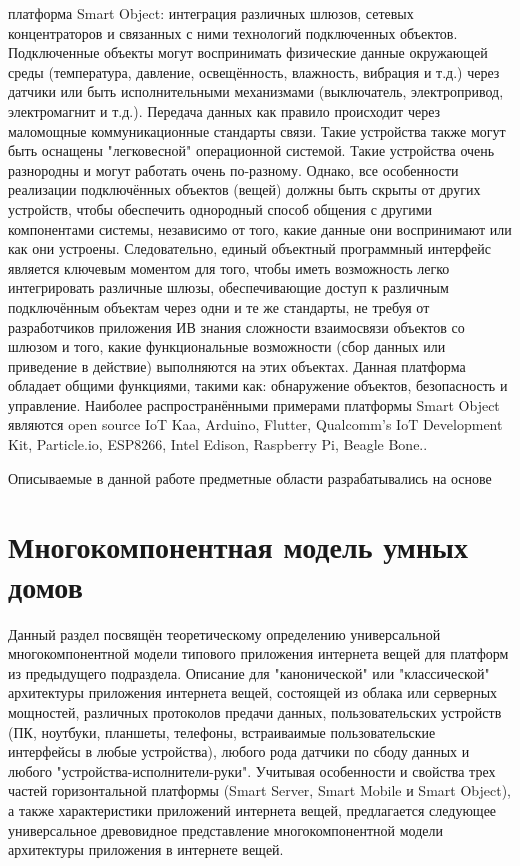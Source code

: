 \begin{textitemize}
    \item платформа Smart Object: интеграция различных шлюзов, сетевых концентраторов и связанных с ними технологий подключенных объектов. Подключенные объекты могут воспринимать физические данные окружающей среды (температура, давление, освещённость, влажность, вибрация и т.д.) через датчики или быть исполнительными механизмами (выключатель, электропривод, электромагнит и т.д.). Передача данных как правило происходит через маломощные коммуникационные стандарты связи. Такие устройства также могут быть оснащены "легковесной" операционной системой. Такие устройства очень разнородны и могут работать очень по-разному. Однако, все особенности реализации подключённых объектов (вещей) должны быть скрыты от других устройств, чтобы обеспечить однородный способ общения с другими компонентами системы, независимо от того, какие данные они воспринимают или как они устроены. Следовательно, единый объектный программный интерфейс является ключевым моментом для того, чтобы иметь возможность легко интегрировать различные шлюзы, обеспечивающие доступ к различным подключённым объектам через одни и те же стандарты, не требуя от разработчиков приложения ИВ знания сложности взаимосвязи объектов со шлюзом и того, какие функциональные возможности (сбор данных или приведение в действие) выполняются на этих объектах. Данная платформа обладает общими функциями, такими как: обнаружение объектов, безопасность и управление. Наиболее распространёнными примерами платформы Smart Object являются open source IoT Kaa, Arduino, Flutter, Qualcomm’s IoT Development Kit, Particle.io, ESP8266, Intel Edison, Raspberry Pi, Beagle Bone..
\end{textitemize}

Описываемые в данной работе предметные области разрабатывались на основе  %

\section{Многокомпонентная модель умных домов}
\label{sec_multicomponent_SH_model}

Данный раздел посвящён теоретическому определению универсальной многокомпонентной модели типового приложения интернета вещей для платформ из предыдущего подраздела. Описание для "канонической" или "классической" архитектуры приложения интернета вещей, состоящей из облака или серверных мощностей, различных протоколов предачи данных, пользовательских устройств (ПК, ноутбуки, планшеты, телефоны, встраиваимые пользовательские интерфейсы в любые устройства), любого рода датчики по сбоду данных и любого "устройства-исполнители-руки". Учитывая особенности и свойства трех частей горизонтальной платформы (Smart Server, Smart Mobile и Smart Object), а также характеристики приложений интернета вещей, предлагается следующее универсальное древовидное представление многокомпонентной модели архитектуры приложения в интернете вещей.

